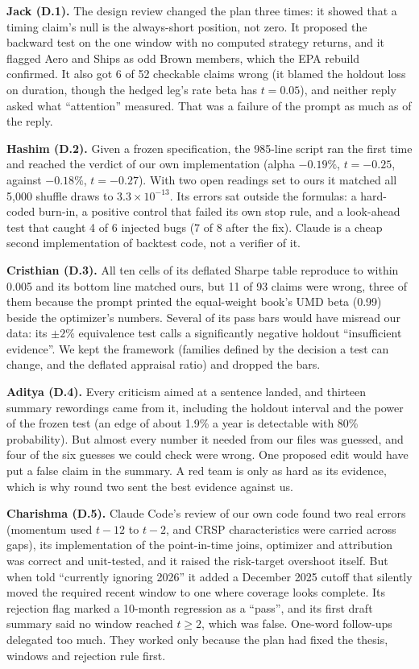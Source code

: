 \documentclass[11pt]{article}
\begin{document}
\textbf{Jack (D.1).} The design review changed the plan three times: it showed that a timing claim's null is the always-short position, not zero. It proposed the backward test on the one window with no computed strategy returns, and it flagged Aero and Ships as odd Brown members, which the EPA rebuild confirmed. It also got 6 of 52 checkable claims wrong (it blamed the holdout loss on duration, though the hedged leg's rate beta has $t=0.05$), and neither reply asked what ``attention'' measured. That was a failure of the prompt as much as of the reply.

\textbf{Hashim (D.2).} Given a frozen specification, the 985-line script ran the first time and reached the verdict of our own implementation (alpha $-0.19\%$, $t=-0.25$, against $-0.18\%$, $t=-0.27$). With two open readings set to ours it matched all 5,000 shuffle draws to $3.3\times10^{-13}$. Its errors sat outside the formulas: a hard-coded burn-in, a positive control that failed its own stop rule, and a look-ahead test that caught 4 of 6 injected bugs (7 of 8 after the fix). Claude is a cheap second implementation of backtest code, not a verifier of it.

\textbf{Cristhian (D.3).} All ten cells of its deflated Sharpe table reproduce to within 0.005 and its bottom line matched ours, but 11 of 93 claims were wrong, three of them because the prompt printed the equal-weight book's UMD beta (0.99) beside the optimizer's numbers. Several of its pass bars would have misread our data: its $\pm2\%$ equivalence test calls a significantly negative holdout ``insufficient evidence''. We kept the framework (families defined by the decision a test can change, and the deflated appraisal ratio) and dropped the bars.

\textbf{Aditya (D.4).} Every criticism aimed at a sentence landed, and thirteen summary rewordings came from it, including the holdout interval and the power of the frozen test (an edge of about 1.9\% a year is detectable with 80\% probability). But almost every number it needed from our files was guessed, and four of the six guesses we could check were wrong. One proposed edit would have put a false claim in the summary. A red team is only as hard as its evidence, which is why round two sent the best evidence against us.

\textbf{Charishma (D.5).} Claude Code's review of our own code found two real errors (momentum used $t-12$ to $t-2$, and CRSP characteristics were carried across gaps), its implementation of the point-in-time joins, optimizer and attribution was correct and unit-tested, and it raised the risk-target overshoot itself. But when told ``currently ignoring 2026'' it added a December 2025 cutoff that silently moved the required recent window to one where coverage looks complete. Its rejection flag marked a 10-month regression as a ``pass'', and its first draft summary said no window reached $t\geq 2$, which was false. One-word follow-ups delegated too much. They worked only because the plan had fixed the thesis, windows and rejection rule first.
\end{document}
